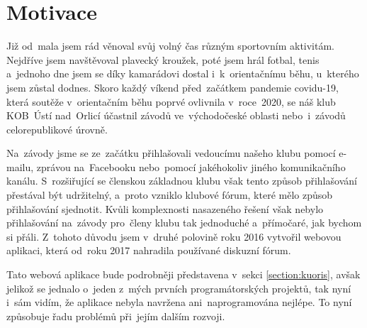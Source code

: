\section{Motivace}\label{section:motivation}
Již od~mala jsem rád věnoval svůj volný čas různým sportovním aktivitám. Nejdříve jsem navštěvoval plavecký kroužek, poté jsem hrál fotbal, tenis a~jednoho dne jsem se díky kamarádovi dostal i~k~orientačnímu běhu, u~kterého jsem zůstal dodnes. Skoro každý víkend před~začátkem pandemie covidu-19, která soutěže v~orientačním běhu poprvé ovlivnila v~roce~2020, se náš klub KOB~Ústí nad~Orlicí účastnil závodů ve~východočeské oblasti nebo~i~závodů celorepublikové úrovně.

Na~závody jsme se ze~začátku přihlašovali vedoucímu našeho klubu pomocí e-mailu, zprávou na~Facebooku nebo~pomocí jakéhokoliv jiného komunikačního kanálu. S~rozšiřující se členskou základnou klubu však tento způsob přihlašování přestával být udržitelný, a~proto vzniklo klubové fórum, které mělo způsob přihlašování sjednotit. Kvůli komplexnosti nasazeného řešení však nebylo přihlašování na~závody pro~členy klubu tak jednoduché a~přímočaré, jak bychom si přáli. Z~tohoto důvodu jsem v~druhé polovině roku 2016 vytvořil webovou aplikaci, která od~roku 2017 nahradila používané diskuzní fórum.

Tato webová aplikace bude podrobněji představena v~sekci \ref{section:kuoris}, avšak jelikož se jednalo o~jeden z~mých prvních programátorských projektů, tak nyní i~sám vidím, že aplikace nebyla navržena ani~naprogramována nejlépe. To nyní způsobuje řadu problémů při~jejím dalším rozvoji.
